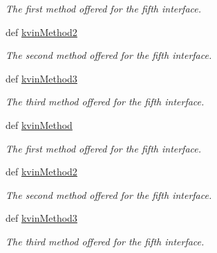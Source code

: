\begin{DoxyCompactItemize}
\begin{DoxyCompactList}\small\item\em The first method offered for the fifth interface. \end{DoxyCompactList}\item 
def \hyperlink{classdoxypypy_1_1test_1_1sample__interfaces_1_1_i_kvin_a1c4979b9222090f88af1755773fa7dd9}{kvin\-Method2}
\begin{DoxyCompactList}\small\item\em The second method offered for the fifth interface. \end{DoxyCompactList}\item 
def \hyperlink{classdoxypypy_1_1test_1_1sample__interfaces_1_1_i_kvin_a811bcb751a1be11fe645c0c4197bd290}{kvin\-Method3}
\begin{DoxyCompactList}\small\item\em The third method offered for the fifth interface. \end{DoxyCompactList}\item 
def \hyperlink{classdoxypypy_1_1test_1_1sample__interfaces_1_1_i_kvin_a511c4e7a1d97956cb9ea4b082fd2eddc}{kvin\-Method}
\begin{DoxyCompactList}\small\item\em The first method offered for the fifth interface. \end{DoxyCompactList}\item 
def \hyperlink{classdoxypypy_1_1test_1_1sample__interfaces_1_1_i_kvin_a1c4979b9222090f88af1755773fa7dd9}{kvin\-Method2}
\begin{DoxyCompactList}\small\item\em The second method offered for the fifth interface. \end{DoxyCompactList}\item 
def \hyperlink{classdoxypypy_1_1test_1_1sample__interfaces_1_1_i_kvin_a811bcb751a1be11fe645c0c4197bd290}{kvin\-Method3}
\begin{DoxyCompactList}\small\item\em The third method offered for the fifth interface. \end{DoxyCompactList}\end{DoxyCompactItemize}
